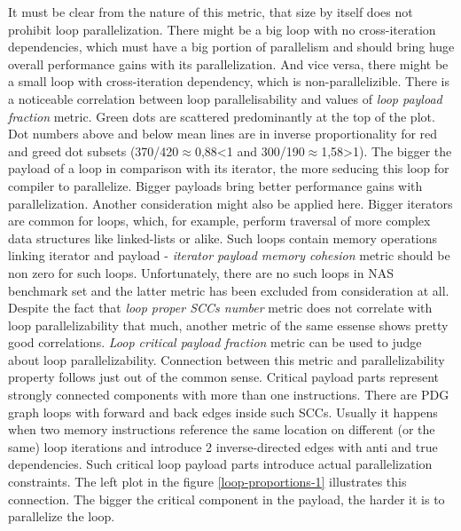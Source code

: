 \null\qquad It must be clear from the nature of this metric, that size by itself does not prohibit loop parallelization. There might be a big loop with no cross-iteration dependencies, which must have a big portion of parallelism and should bring huge overall performance gains with its parallelization. And vice versa, there might be a small loop with cross-iteration dependency, which is non-parallelizible.\newline
\null\qquad There is a noticeable correlation between loop parallelisability and values of \textit{loop payload fraction} metric. Green dots are scattered predominantly at the top of the plot. Dot numbers above and below mean lines are in inverse proportionality for red and greed dot subsets (370/420$\approx$0,88\textless 1 and 300/190$\approx$1,58\textgreater 1).  The bigger the payload of a loop in comparison with its iterator, the more seducing this loop for compiler to parallelize. Bigger payloads bring better performance gains with parallelization. Another consideration might also be applied here. Bigger iterators are common for loops, which, for example, perform traversal of more complex data structures like linked-lists or alike. Such loops contain memory operations linking iterator and payload - \textit{iterator payload memory cohesion} metric should be non zero for such loops. Unfortunately, there are no such loops in NAS benchmark set and the latter metric has been excluded from consideration at all.\newline 
\null\qquad Despite the fact that \textit{loop proper SCCs number} metric does not correlate with loop parallelizability that much, another metric of the same essense shows pretty good correlations. \textit{Loop critical payload fraction} metric can be used to judge about loop parallelizability. Connection between this metric and parallelizability property follows just out of the common sense. Critical payload parts represent strongly connected components with more than one instructions. There are PDG graph loops with forward and back edges inside such SCCs. Usually it happens when two memory instructions reference the same location on different (or the same) loop iterations and introduce 2 inverse-directed edges with anti and true dependencies. Such critical loop payload parts introduce actual parallelization constraints. The left plot in the figure \ref{loop-proportions-1} illustrates this connection. The bigger the critical component in the payload, the harder it is to parallelize the loop.

